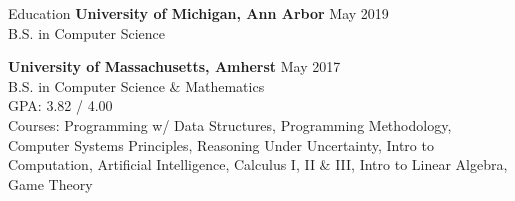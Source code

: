 \documentclass{resume} %
\begin{document}
	
	

	\begin{rSection}{Education}
		{\bf University of Michigan, Ann Arbor} \hfill {May 2019} \\ 
		B.S. in Computer Science
		
		{\bf University of Massachusetts, Amherst} \hfill {May 2017} \\ 
		B.S. in Computer Science \& Mathematics \\
		GPA: 3.82 / 4.00 \smallskip \\
		Courses: Programming w/ Data Structures, Programming Methodology, Computer Systems Principles, Reasoning Under Uncertainty, Intro to Computation, Artificial Intelligence, Calculus I, II \& III, Intro to Linear Algebra, Game Theory
	\end{rSection}
	
	
	
	
\end{document}
